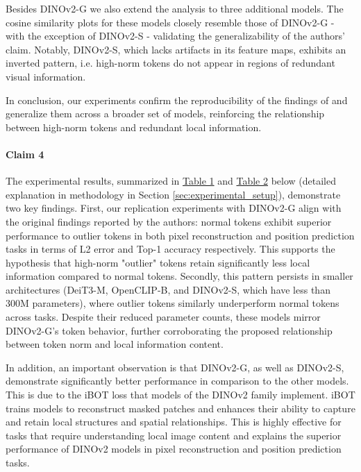 \documentclass[10pt]{article} %
\begin{document}
Besides DINOv2-G we also extend the analysis to three additional models. The cosine similarity plots for these models closely resemble those of DINOv2-G - with the exception of DINOv2-S - validating the generalizability of the authors' claim. Notably, DINOv2-S, which lacks artifacts in its feature maps, exhibits an inverted pattern, i.e. high-norm tokens do not appear in regions of redundant visual information.

In conclusion, our experiments confirm the reproducibility of the findings of \citet{darcet2024registers} and generalize them across a broader set of models, reinforcing the relationship between high-norm tokens and redundant local information.

\paragraph{Claim 4}
The experimental results, summarized in \hyperref[tab:pos_pred_results]{Table 1} and \hyperref[tab:pixel_recon_results]{Table 2} below (detailed explanation in methodology in Section \ref{sec:experimental_setup}), demonstrate two key findings. First, our replication experiments with DINOv2-G align with the original findings reported by the authors: normal tokens exhibit superior performance to outlier tokens in both pixel reconstruction and position prediction tasks in terms of L2 error and Top-1 accuracy respectively. This supports the hypothesis that high-norm "outlier" tokens retain significantly less local information compared to normal tokens. Secondly, this pattern persists in smaller architectures (DeiT3-M, OpenCLIP-B, and DINOv2-S, which have less than 300M parameters), where outlier tokens similarly underperform normal tokens across tasks. Despite their reduced parameter counts, these models mirror DINOv2-G’s token behavior, further corroborating the proposed relationship between token norm and local information content. 

In addition, an important observation is that DINOv2-G, as well as DINOv2-S, demonstrate significantly better performance in comparison to the other models. This is due to the iBOT loss \citep{zhou2022ibotimagebertpretraining} that models of the DINOv2 family implement. iBOT trains models to reconstruct masked patches and enhances their ability to capture and retain local structures and spatial relationships. This is highly effective for tasks that require understanding local image content and explains the superior performance of DINOv2 models in pixel reconstruction and position prediction tasks.
\end{document}
